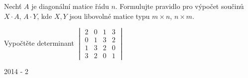 \begin{questions}
\newpage

\question Nechť \(A\) je diagonální matice řádu \(n\). Formulujte pravidlo pro výpočet součinů \(X \cdot A\), \(A \cdot Y\), kde \(X, Y\) jsou libovolné matice typu \(m \times n\), \(n \times m\).

\question Vypočtěte determinant \(\begin{vmatrix}
    2 & 0 & 1 & 3\\
    0 & 1 & 3 & 2\\
    1 & 3 & 2 & 0\\
    3 & 2 & 0 & 1
\end{vmatrix}\)

\end{questions}

\newpage
{\large 2014 - 2}

